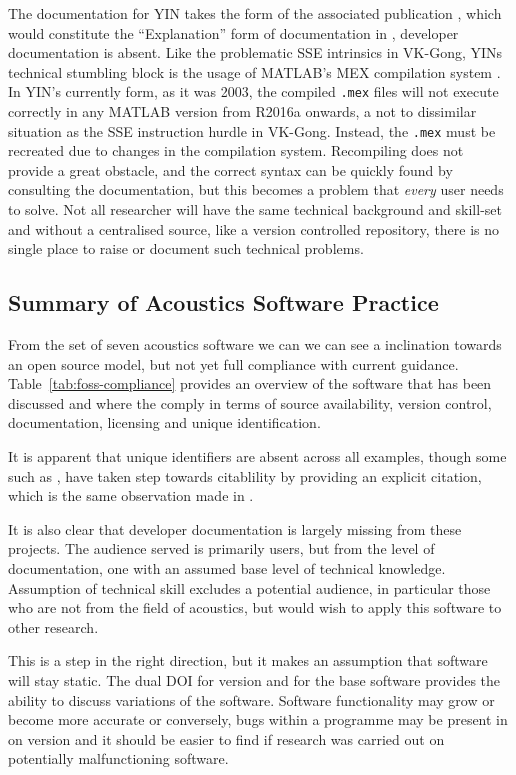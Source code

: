 The documentation for YIN takes the form of the associated publication \cite{cheveigne_yin_2002}, which would constitute the ``Explanation'' form of documentation in \textcite{procida_diataxis_2025}, developer documentation is absent.
Like the problematic SSE intrinsics in VK-Gong, YINs technical stumbling block is the usage of MATLAB's MEX compilation system \cite{matlab_mex_2025}. In YIN's currently form, as it was 2003, the compiled \texttt{.mex} files will not execute correctly in any MATLAB version from R2016a onwards, a not to dissimilar situation as the SSE instruction hurdle in VK-Gong. Instead, the \texttt{.mex} must be recreated due to changes in the compilation system. Recompiling does not provide a great obstacle, and the correct syntax can be quickly found by consulting the documentation, but this becomes a problem that \textit{every} user needs to solve. Not all researcher will have the same technical background and skill-set and without a centralised source, like a version controlled repository, there is no single place to raise or document such technical problems.


\subsection{Summary of Acoustics Software Practice}

From the set of seven acoustics software we can we can see a inclination towards an open source model, but not yet full compliance with current guidance. Table~\ref{tab:foss-compliance} provides an overview of the software that has been discussed and where the comply in terms of source availability, version control, documentation, licensing and unique identification.  

It is apparent that unique identifiers are absent across all examples, though some such as ,  have taken step towards citablility by providing an explicit citation, which is the same observation made in \textcite{hornikx_exploring_2024}.

It is also clear that developer documentation is largely missing from these projects. The audience served is  primarily users, but from the level of documentation, one with an assumed base level of technical knowledge. Assumption of technical skill excludes a potential audience, in particular those who are not from the field of acoustics, but would wish to apply this software to other research.

This is a step in the right direction, but it makes an assumption that software will stay static. The dual DOI for version and for the base software provides the ability to discuss variations of the software. Software functionality may grow or become more accurate or conversely, bugs within a programme may be present in on version and it should be easier to find if research was carried out on potentially malfunctioning software.

